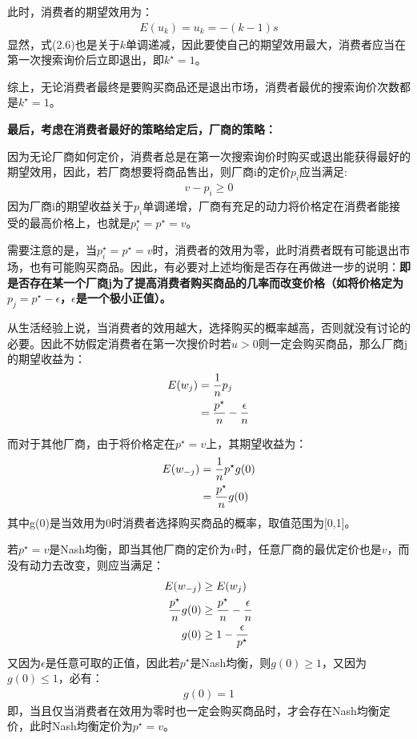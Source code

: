 此时，消费者的期望效用为：
\begin{align}
    E(u_k) = u_k = -(k-1)s
\end{align}
显然，式(2.6)也是关于$k$单调递减，因此要使自己的期望效用最大，消费者应当在第一次搜索询价后立即退出，即$k^{\star}=1$。

综上，无论消费者最终是要购买商品还是退出市场，消费者最优的搜索询价次数都是$k^{\star}=1$。

\textbf{最后，考虑在消费者最好的策略给定后，厂商的策略：}

因为无论厂商如何定价，消费者总是在第一次搜索询价时购买或退出能获得最好的期望效用，因此，若厂商想要将商品售出，则厂商i的定价$p_i$应当满足:
\begin{align}
    v - p_i \geq 0
\end{align}
因为厂商i的期望收益关于$p_i$单调递增，厂商有充足的动力将价格定在消费者能接受的最高价格上，也就是$p_i^{\star}=p^{\star}=v$。

需要注意的是，当$p_i^{\star}=p^{\star}=v$时，消费者的效用为零，此时消费者既有可能退出市场，也有可能购买商品。因此，有必要对上述均衡是否存在再做进一步的说明：\textbf{即是否存在某一个厂商j为了提高消费者购买商品的几率而改变价格（如将价格定为$p_j = p^{\star}-\epsilon$，$\epsilon$是一个极小正值）。}

从生活经验上说，当消费者的效用越大，选择购买的概率越高，否则就没有讨论的必要。因此不妨假定消费者在第一次搜价时若$u>0$则一定会购买商品，那么厂商j的期望收益为：
\begin{align}
    E(w_j)&=\frac{1}{n}p_j \notag \\
    &=\frac{p^{\star}}{n}-\frac{\epsilon}{n}
\end{align}

而对于其他厂商，由于将价格定在$p^{\star}=v$上，其期望收益为：
\begin{align}
    E(w_{-j})&=\frac{1}{n}p^{\star}g(0) \notag \\
    &=\frac{p^{\star}}{n}g(0)
\end{align}
其中g(0)是当效用为0时消费者选择购买商品的概率，取值范围为[0,1]。

若$p^{\star}=v$是Nash均衡，即当其他厂商的定价为$v$时，任意厂商的最优定价也是$v$，而没有动力去改变，则应当满足：
\begin{align}
    E(w_{-j})&\geq  E(w_j) \notag \\
    \frac{p^{\star}}{n}g(0) &\geq \frac{p^{\star}}{n}-\frac{\epsilon}{n} \notag \\
    g(0)&\geq 1-\frac{\epsilon}{p^{\star}} 
\end{align}
又因为$\epsilon$是任意可取的正值，因此若$p^{\star}$是Nash均衡，则$g(0)\geq1$，又因为$g(0)\leq 1$，必有：
\begin{align}
    g(0) = 1
\end{align}
即，当且仅当消费者在效用为零时也一定会购买商品时，才会存在Nash均衡定价，此时Nash均衡定价为$p^{\star}=v$。












